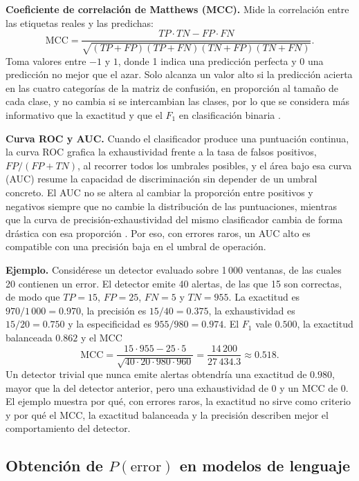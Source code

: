 \textbf{Coeficiente de correlación de Matthews (MCC).} Mide la correlación entre las etiquetas reales y las predichas:
\begin{equation}
\mathrm{MCC} = \frac{TP \cdot TN - FP \cdot FN}{\sqrt{(TP+FP)(TP+FN)(TN+FP)(TN+FN)}}.
\end{equation}
Toma valores entre $-1$ y $1$, donde 1 indica una predicción perfecta y 0 una predicción no mejor que el azar. Solo alcanza un valor alto si la predicción acierta en las cuatro categorías de la matriz de confusión, en proporción al tamaño de cada clase, y no cambia si se intercambian las clases, por lo que se considera más informativo que la exactitud y que el $F_1$ en clasificación binaria \cite{chicco2020_mcc}.

\textbf{Curva ROC y AUC.} Cuando el clasificador produce una puntuación continua, la curva ROC grafica la exhaustividad frente a la tasa de falsos positivos, $FP/(FP + TN)$, al recorrer todos los umbrales posibles, y el área bajo esa curva (AUC) resume la capacidad de discriminación sin depender de un umbral concreto. El AUC no se altera al cambiar la proporción entre positivos y negativos siempre que no cambie la distribución de las puntuaciones, mientras que la curva de precisión-exhaustividad del mismo clasificador cambia de forma drástica con esa proporción \cite{richardson2024_roc}. Por eso, con errores raros, un AUC alto es compatible con una precisión baja en el umbral de operación.

\textbf{Ejemplo.} Considérese un detector evaluado sobre 1\,000 ventanas, de las cuales 20 contienen un error. El detector emite 40 alertas, de las que 15 son correctas, de modo que $TP = 15$, $FP = 25$, $FN = 5$ y $TN = 955$. La exactitud es $970/1\,000 = 0.970$, la precisión es $15/40 = 0.375$, la exhaustividad es $15/20 = 0.750$ y la especificidad es $955/980 = 0.974$. El $F_1$ vale $0.500$, la exactitud balanceada $0.862$ y el MCC
\begin{equation}
\mathrm{MCC} = \frac{15 \cdot 955 - 25 \cdot 5}{\sqrt{40 \cdot 20 \cdot 980 \cdot 960}} = \frac{14\,200}{27\,434.3} \approx 0.518.
\end{equation}
Un detector trivial que nunca emite alertas obtendría una exactitud de $0.980$, mayor que la del detector anterior, pero una exhaustividad de 0 y un MCC de 0. El ejemplo muestra por qué, con errores raros, la exactitud no sirve como criterio y por qué el MCC, la exactitud balanceada y la precisión describen mejor el comportamiento del detector.

\subsection{Obtención de $P(\text{error})$ en modelos de lenguaje}\label{sec:mt_probabilidad}

